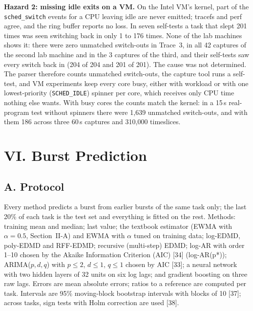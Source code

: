 \documentclass{article}
\begin{document}
\textbf{Hazard 2: missing idle exits on a VM.} On the Intel VM's kernel, part of the \texttt{sched\_switch} events for a CPU leaving idle are never emitted; tracefs and perf agree, and the ring buffer reports no loss. In seven self-tests a task that slept 201 times was seen switching back in only 1 to 176 times. None of the lab machines shows it: there were zero unmatched switch-outs in Trace~3, in all 42 captures of the second lab machine and in the 3 captures of the third, and their self-tests saw every switch back in (204 of 204 and 201 of 201). The cause was not determined. The parser therefore counts unmatched switch-outs, the capture tool runs a self-test, and VM experiments keep every core busy, either with workload or with one lowest-priority (\texttt{SCHED\_IDLE}) spinner per core, which receives only CPU time nothing else wants. With busy cores the counts match the kernel: in a 15\,s real-program test without spinners there were 1{,}639 unmatched switch-outs, and with them 186 across three 60\,s captures and 310{,}000 timeslices.

\section*{VI. Burst Prediction}
\subsection*{A. Protocol}
Every method predicts a burst from earlier bursts of the same task only; the last 20\% of each task is the test set and everything is fitted on the rest. Methods: training mean and median; last value; the textbook estimator (EWMA with $\alpha=0.5$, Section~II-A) and EWMA with $\alpha$ tuned on training data; log-EDMD, poly-EDMD and RFF-EDMD; recursive (multi-step) EDMD; log-AR with order 1--10 chosen by the Akaike Information Criterion (AIC) [34] (log-AR(p*)); ARIMA($p,d,q$) with $p\le2$, $d\le1$, $q\le1$ chosen by AIC [33]; a neural network with two hidden layers of 32 units on six log lags; and gradient boosting on three raw lags. Errors are mean absolute errors; ratios to a reference are computed per task. Intervals are 95\% moving-block bootstrap intervals with blocks of 10 [37]; across tasks, sign tests with Holm correction are used [38].
\end{document}
